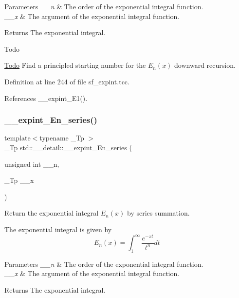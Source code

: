 \begin{DoxyParams}{Parameters}
{\em \+\_\+\+\_\+n} & The order of the exponential integral function. \\
\hline
{\em \+\_\+\+\_\+x} & The argument of the exponential integral function. \\
\hline
\end{DoxyParams}
\begin{DoxyReturn}{Returns}
The exponential integral. 
\end{DoxyReturn}
\begin{DoxyRefDesc}{Todo}
\item[\hyperlink{todo__todo000005}{Todo}]Find a principled starting number for the $ E_n(x) $ downward recursion. \end{DoxyRefDesc}


Definition at line 244 of file sf\+\_\+expint.\+tcc.



References \+\_\+\+\_\+expint\+\_\+\+E1().

\mbox{\label{namespacestd_1_1____detail_a5c51269e411cd82ffec2e63212f76b41}} 
\subsubsection{\texorpdfstring{\+\_\+\+\_\+expint\+\_\+\+En\+\_\+series()}{\_\_expint\_En\_series()}}
{\footnotesize\ttfamily template$<$typename \+\_\+\+Tp $>$ \\
\+\_\+\+Tp std\+::\+\_\+\+\_\+detail\+::\+\_\+\+\_\+expint\+\_\+\+En\+\_\+series (\begin{DoxyParamCaption}\item[{unsigned int}]{\+\_\+\+\_\+n,  }\item[{\+\_\+\+Tp}]{\+\_\+\+\_\+x }\end{DoxyParamCaption})}



Return the exponential integral $ E_n(x) $ by series summation. 

The exponential integral is given by \[ E_n(x) = \int_{1}^\infty \frac{e^{-xt}}{t^n} dt \]


\begin{DoxyParams}{Parameters}
{\em \+\_\+\+\_\+n} & The order of the exponential integral function. \\
\hline
{\em \+\_\+\+\_\+x} & The argument of the exponential integral function. \\
\hline
\end{DoxyParams}
\begin{DoxyReturn}{Returns}
The exponential integral. 
\end{DoxyReturn}


